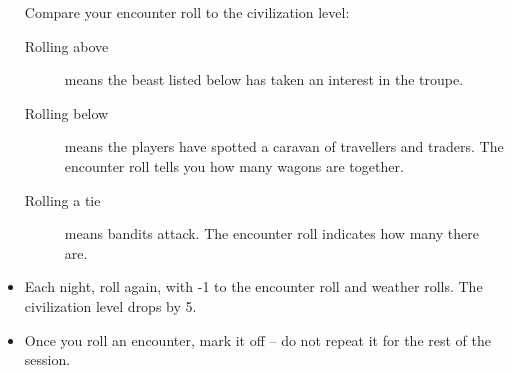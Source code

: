 \begin{multicols}{2}
\begin{itemize}
  Compare your encounter roll to the civilization level:
  \begin{description}
    \item[Rolling above]
    means the beast listed below has taken an interest in the troupe.
    \item[Rolling below]
    means the players have spotted a caravan of travellers and traders.
    The encounter roll tells you how many wagons are together.
    \item[Rolling a tie]
    means bandits attack.
    The encounter roll indicates how many there are.
  \end{description}
  \item
  Each night, roll again, with -1 to the encounter roll and weather rolls.
  The civilization level drops by 5.
  \item
  Once you roll an encounter, mark it off -- do not repeat it for the rest of the session.
\end{itemize}

\end{multicols}

\bigLine

\pagebreak


